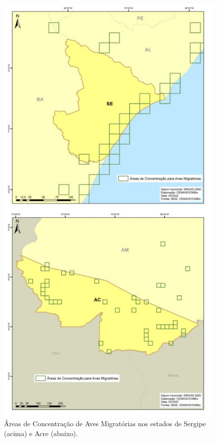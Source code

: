 \documentclass[
  oneside]{scrbook}
\begin{document}
\begin{figure}[H]

{\centering \includegraphics[width=0.7\linewidth]{imagens/cap07/Fig_15_SE_AC} 

}

\caption{Áreas de Concentração de Aves Migratórias nos estados de Sergipe (acima) e Acre (abaixo).}\label{fig:35}
\end{figure}
\end{document}
